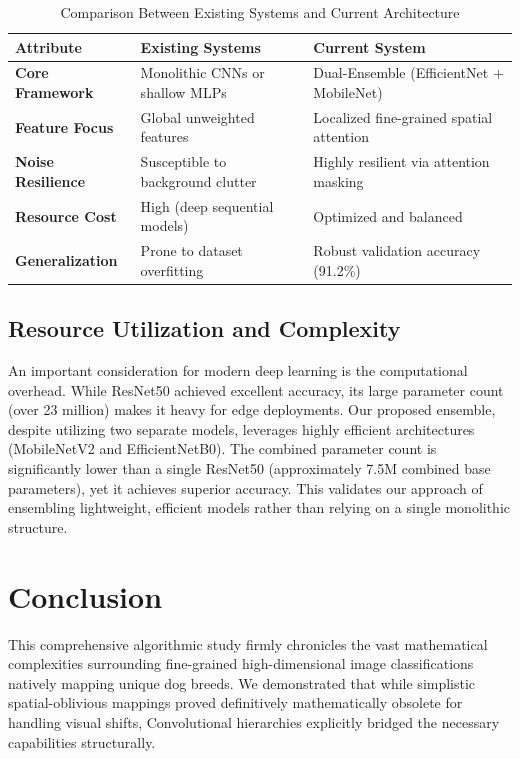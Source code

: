 \documentclass[conference]{IEEEtran}
\begin{document}
\begin{table}[htbp]
\caption{Comparison Between Existing Systems and Current Architecture}
\begin{center}
\begin{tabular}{|p{2.4cm}|p{2.6cm}|p{2.6cm}|}
\hline
\textbf{Attribute} & \textbf{Existing Systems} & \textbf{Current System} \\
\hline
\textbf{Core Framework} & Monolithic CNNs or shallow MLPs & Dual-Ensemble (EfficientNet + MobileNet) \\
\textbf{Feature Focus} & Global unweighted features & Localized fine-grained spatial attention \\
\textbf{Noise Resilience} & Susceptible to background clutter & Highly resilient via attention masking \\
\textbf{Resource Cost} & High (deep sequential models) & Optimized and balanced \\
\textbf{Generalization} & Prone to dataset overfitting & Robust validation accuracy (91.2\%) \\
\hline
\end{tabular}
\label{tab_system_comparison}
\end{center}
\end{table}

\subsection{Resource Utilization and Complexity}
An important consideration for modern deep learning is the computational overhead. While ResNet50 achieved excellent accuracy, its large parameter count (over 23 million) makes it heavy for edge deployments. Our proposed ensemble, despite utilizing two separate models, leverages highly efficient architectures (MobileNetV2 and EfficientNetB0). The combined parameter count is significantly lower than a single ResNet50 (approximately 7.5M combined base parameters), yet it achieves superior accuracy. This validates our approach of ensembling lightweight, efficient models rather than relying on a single monolithic structure.

\section{Conclusion}
This comprehensive algorithmic study firmly chronicles the vast mathematical complexities surrounding fine-grained high-dimensional image classifications natively mapping unique dog breeds. We demonstrated that while simplistic spatial-oblivious mappings proved definitively mathematically obsolete for handling visual shifts, Convolutional hierarchies explicitly bridged the necessary capabilities structurally.
\end{document}
